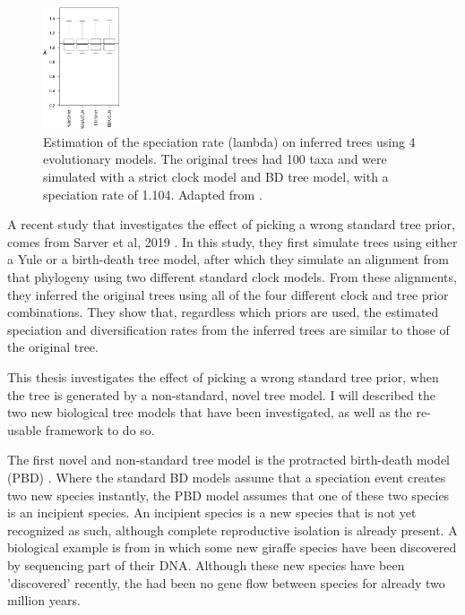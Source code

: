 \begin{figure}[H]
  \includegraphics[width=0.2\textwidth]{sarver2019choice_top_4_bars.png}
  \caption{
    Estimation of the speciation rate (lambda)
    on inferred trees using 4 evolutionary models.
    The original trees had 100 taxa and were simulated with a strict clock model 
    and BD tree model, with a speciation rate of 1.104.
    Adapted from \cite{sarver2019choice}.
 }
  \label{fig:sarver2019choice}
\end{figure}

A recent study that investigates the effect of picking
a wrong standard tree prior, comes from Sarver et al, 2019 \cite{sarver2019choice}.
In this study, they first simulate trees using either a Yule or a birth-death
tree model, after which they simulate an alignment from that phylogeny
using two different standard clock models. From these alignments, 
they inferred the original trees using all of the four 
different clock and tree prior combinations. 
They show that, regardless which priors are used,
the estimated speciation and diversification rates 
from the inferred trees are similar to those of the original tree.

This thesis investigates the effect of picking a wrong standard
tree prior, when the tree is generated by a non-standard, novel tree model.
I will described the two new biological tree models that have been
investigated, as well as the re-usable framework to do so. 

The first novel and non-standard tree model is the protracted birth-death
model (PBD) \cite{etienne2012prolonging}.
Where the standard BD models assume that a speciation event creates
two new species instantly, the PBD model assumes that one of these two species
is an incipient species. An incipient species is a new species
that is not yet recognized as such, although complete reproductive
isolation is already present.
A biological example is from \cite{fennessy2013mitochondrial} in which
some new giraffe species have been discovered by sequencing
part of their DNA. Although these new species have been
'discovered' recently, the had been no gene flow between species
for already two million years.

